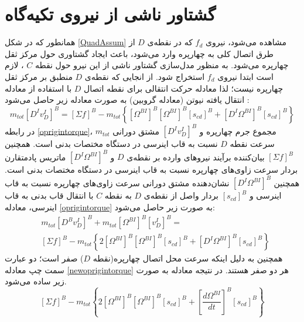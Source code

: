\section{گشتاور ناشی از نیروی تكیه‌گاه}
همانطور که در شكل \ref{QuadAssum} مشاهده می‌شود، نیروی
$f_d$
که در نقطه‌ی 
$D$
از طرق اتصال کلی به چهارپره وارد می‌شود، باعث ایجاد گشتاوری حول مرکز ثقل چهارپره می‌شود. به منظور مدل‌سازی گشتاور ناشی از این نیرو حول نقطه
$C$
، لازم است ابتدا نیروی
$f_d$
استخراج شود. از انجایی که نقطه‌ی
$D$
منطبق بر مرکز ثقل چهارپره نیست؛ لذا معادله حرکت انتقالی برای نقطه اتصال
$D$
با استفاده از معادله انتقال یافته نیوتن (معادله گروبین) به صورت معادله زیر حاصل می‌شود
\cite{zipfel2000modeling}
:
\begin{equation}\label{oprigintorque}
	m_{tot} \left[D^Iv_D^I\right]^B = 
	\left[\Sigma f\right]^B-m_{tot}\left\{
	\left[\Omega^{BI}\right]^B
	\left[\Omega^{BI}\right]^B
	\left[s_{cd}\right]^B+
	\left[D^I\Omega^{BI}\right]^B
	\left[s_{cd}\right]^B
	\right\}
\end{equation}
در رابطه
\ref{oprigintorque}، 
$m_{tot}$
مجموع جرم چهارپره و 
$\left[D^Iv_D^I\right]^B$
مشتق دورانی سرعت نقطه
$D$
نسبت به قاب اینرسی در دستگاه مختصات بدنی است. همچنین
$\left[\Sigma f\right]^B$
بیان‌کننده برآیند نیروهای وارده بر نقطه‌ی
$D$
و
$\left[D^I\Omega^{BI}\right]^B$
ماتریس پادمتقارن بردار سرعت زاوی‌های چهارپره نسبت به قاب اینرسی در دستگاه مختصات بدنی است. همچنین
$\left[D^I\Omega^{BI}\right]^B$
نشان‌دهنده مشتق دورانی سرعت زاوی‌های چهارپره نسبت به قاب اینرسی و 
$\left[s_{cd}\right]^B$
بردار واصل از نقطه‌ی
$D$
به نقطه
$C$
با انتقال قاب بدنی به قاب اینرسی، معادله 
\ref{oprigintorque}
به صورت زیر حاصل می‌شود:
\begin{equation}
\begin{split}\label{newoprigintorque}
	&m_{tot} \left[D^Bv_D^I\right]^B +
	m_{tot}\left[\Omega^{BI}\right]^B
	\left[v_D^{I}\right]^B = \\
	&\left[\Sigma f\right]^B-m_{tot}\left\{2
	\left[\Omega^{BI}\right]^B
	\left[\Omega^{BI}\right]^B
	\left[s_{cd}\right]^B+
	\left[D^I\Omega^{BI}\right]^B
	\left[s_{cd}\right]^B
	\right\}
\end{split}
\end{equation}
همچنین به دلیل اینكه سرعت محل اتصال چهارپره(نقطه
$D$)
صفر است؛ دو عبارت سمت چپ معادله
\ref{newoprigintorque} 
هر دو صفر هستند. در نتیجه معادله به صورت زیر ساده می‌شود.
\begin{equation}\label{newnewoprigintorque}
	\left[\Sigma f\right]^B - 
	m_{tot}\left\{2
	\left[\Omega^{BI}\right]^B
	\left[\Omega^{BI}\right]^B
	\left[s_{cd}\right]^B+
	\left[\dfrac{d\Omega^{BI}}{dt}\right]^B
	\left[s_{cd}\right]^B
	\right\}
\end{equation}
